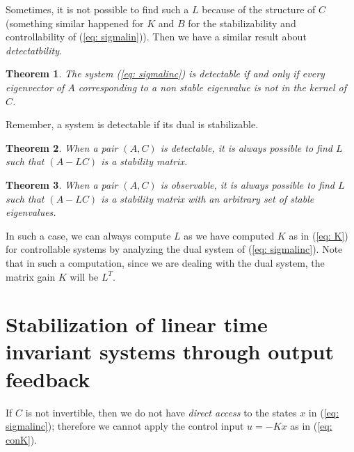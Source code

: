 \documentclass[11pt,a4paper,titlepage]{article}
\newtheorem{theorem}{Theorem}
\begin{document}
Sometimes, it is not possible to find such a $L$ because of the structure of $C$ (something similar happened for $K$ and $B$ for the stabilizability and controllability of (\ref{eq: sigmalin})). Then we have a similar result about \emph{detectatbility}.
\begin{theorem}
	The system (\ref{eq: sigmalinc}) is \emph{detectable} if and only if every eigenvector of $A$ corresponding to a non stable eigenvalue is not in the kernel of $C$.
\end{theorem}
Remember, a system is detectable if its dual is stabilizable.
\begin{theorem}
	When a pair $(A,C)$ is detectable, it is always possible to find $L$ such that $(A-LC)$ is a stability matrix.
\end{theorem}
\begin{theorem}
	When a pair $(A,C)$ is observable, it is always possible to find $L$ such that $(A-LC)$ is a stability matrix with an arbitrary set of stable eigenvalues.
\end{theorem}
In such a case, we can always compute $L$ as we have computed $K$ as in (\ref{eq: K}) for controllable systems by analyzing the dual system of (\ref{eq: sigmalinc}). Note that in such a computation, since we are dealing with the dual system, the matrix gain $K$ will be $L^T$.

\section{Stabilization of linear time invariant systems through output feedback}
If $C$ is not invertible, then we do not have \emph{direct access} to the states $x$ in (\ref{eq: sigmalinc}); therefore we cannot apply the control input $u = -Kx$ as in (\ref{eq: conK}).
\end{document}
